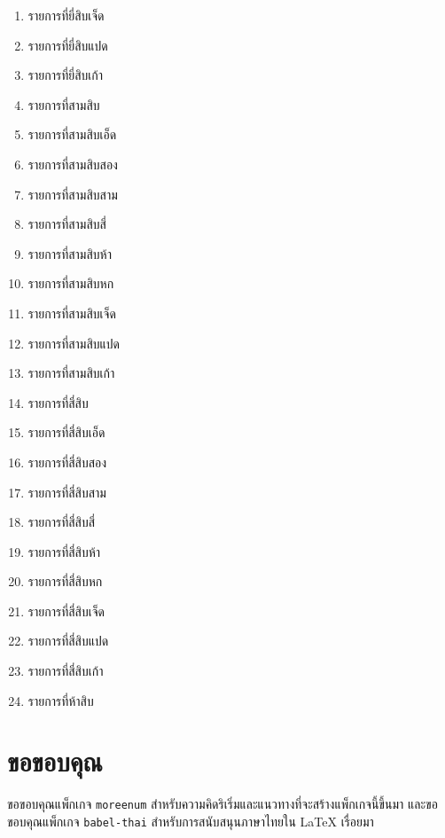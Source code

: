 \documentclass[11pt]{ltxguide}
\begin{document}
\begin{multicols}{4}
\begin{enumerate}[listparindent=0pc,topsep=0pc,itemsep=0pc,label={\thaimultialph*.}]
        \item  รายการ{\wbr}ที่{\wbr}ยี่{\wbr}สิบ{\wbr}เจ็ด{\wbr}
        \item  รายการ{\wbr}ที่{\wbr}ยี่{\wbr}สิบ{\wbr}แปด{\wbr}
        \item  รายการ{\wbr}ที่{\wbr}ยี่{\wbr}สิบ{\wbr}เก้า{\wbr}
        \item  รายการ{\wbr}ที่{\wbr}สาม{\wbr}สิบ{\wbr}
        \item  รายการ{\wbr}ที่{\wbr}สาม{\wbr}สิบ{\wbr}เอ็ด{\wbr}
        \item  รายการ{\wbr}ที่{\wbr}สาม{\wbr}สิบ{\wbr}สอง{\wbr}
        \item  รายการ{\wbr}ที่{\wbr}สาม{\wbr}สิบ{\wbr}สาม{\wbr}
        \item  รายการ{\wbr}ที่{\wbr}สาม{\wbr}สิบ{\wbr}สี่{\wbr}
        \item  รายการ{\wbr}ที่{\wbr}สาม{\wbr}สิบ{\wbr}ห้า{\wbr}
        \item  รายการ{\wbr}ที่{\wbr}สาม{\wbr}สิบ{\wbr}หก{\wbr}
        \item  รายการ{\wbr}ที่{\wbr}สาม{\wbr}สิบ{\wbr}เจ็ด{\wbr}
        \item  รายการ{\wbr}ที่{\wbr}สาม{\wbr}สิบ{\wbr}แปด{\wbr}
        \item  รายการ{\wbr}ที่{\wbr}สาม{\wbr}สิบ{\wbr}เก้า{\wbr}
        \item  รายการ{\wbr}ที่{\wbr}สี่{\wbr}สิบ{\wbr}
        \item  รายการ{\wbr}ที่{\wbr}สี่{\wbr}สิบ{\wbr}เอ็ด{\wbr}
        \item  รายการ{\wbr}ที่{\wbr}สี่{\wbr}สิบ{\wbr}สอง{\wbr}
        \item  รายการ{\wbr}ที่{\wbr}สี่{\wbr}สิบ{\wbr}สาม{\wbr}
        \item  รายการ{\wbr}ที่{\wbr}สี่{\wbr}สิบ{\wbr}สี่{\wbr}
        \item  รายการ{\wbr}ที่{\wbr}สี่{\wbr}สิบ{\wbr}ห้า{\wbr}
        \item  รายการ{\wbr}ที่{\wbr}สี่{\wbr}สิบ{\wbr}หก{\wbr}
        \item  รายการ{\wbr}ที่{\wbr}สี่{\wbr}สิบ{\wbr}เจ็ด{\wbr}
        \item  รายการ{\wbr}ที่{\wbr}สี่{\wbr}สิบ{\wbr}แปด{\wbr}
        \item  รายการ{\wbr}ที่{\wbr}สี่{\wbr}สิบ{\wbr}เก้า{\wbr}
        \item  รายการ{\wbr}ที่{\wbr}ห้า{\wbr}สิบ{\wbr}
    \end{enumerate}
\end{multicols}

\section{ขอ{\wbr}ขอบคุณ}

ขอ{\wbr}ขอบคุณ{\wbr}แพ็ก{\wbr}เก{\wbr}จ \texttt{moreenum} สำหรับ{\wbr}ความคิด{\wbr}ริเริ่ม{\wbr}และ{\wbr}แนวทาง{\wbr}ที่{\wbr}จะ{\wbr}สร้าง{\wbr}แพ็ก{\wbr}เก{\wbr}จ{\wbr}นี้{\wbr}ขึ้น{\wbr}มา และ{\wbr}ขอ{\wbr}ขอบคุณ{\wbr}แพ็ก{\wbr}เก{\wbr}จ \texttt{babel-thai} สำหรับ{\wbr}การ{\wbr}สนับสนุน{\wbr}ภาษา{\wbr}ไทย{\wbr}ใน \textlatin{\textrm\LaTeX} เรื่อย{\wbr}มา{\wbr}
\end{document}
